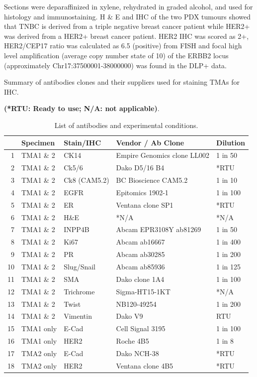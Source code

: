 Sections were deparaffinized in xylene, rehydrated in graded alcohol, and used for histology and immunostaining. 
H \& E and \ac{IHC}  of the two PDX tumours showed that TNBC is  derived from a triple negative breast cancer patient while HER2+ was derived from a HER2+ breast cancer patient. HER2 IHC was scored as 2+, HER2/CEP17 ratio was calculated as 6.5 (positive)\cite{ahn2020her2} from  \ac{FISH}  and focal high level amplification (average copy number state of 10) of the \ac{ERBB2} locus (approximately Chr17:37500001-38000000) was found in the DLP+ data.

\begin{table}
\centering
\caption{List of antibodies and experimental conditions.}
Summary of antibodies clones and their suppliers used for staining TMAs for IHC.

\small\textbf{(*RTU: Ready to use; N/A: not applicable)}.
\label{stab:antibodieslist}
\begin{tabular}{|rl|l|l|l|}
  \hline
 & Specimen & Stain/IHC & Vendor / Ab Clone & Dilution  \\ 
  \hline
1 & TMA1 \& 2 & CK14 & Empire Genomics clone LL002 & 1 in 50 \\ 
  2 & TMA1 \& 2 & Ck5/6 & Dako D5/16 B4 & *RTU  \\ 
  3 & TMA1 \& 2 & Ck8 (CAM5.2) & BC Bioscience CAM5.2 & 1 in 10  \\ 
  4 & TMA1 \& 2 & EGFR & Epitomics 1902-1 & 1 in 100  \\ 
  5 & TMA1 \& 2 & ER & Ventana  clone SP1 & *RTU\\ 
  6 & TMA1 \& 2 & H\&E & *N/A & *N/A \\ 
  7 & TMA1 \& 2 & INPP4B & Abcam EPR3108Y ab81269 & 1 in 50 \\ 
  8 & TMA1 \& 2 & Ki67 & Abcam ab16667  & 1 in 400  \\ 
  9 & TMA1 \& 2 & PR & Abcam ab30285 & 1 in 200  \\ 
  10 & TMA1 \& 2 & Slug/Snail & Abcam ab85936 & 1 in 125 \\ 
  11 & TMA1 \& 2 & SMA & Dako clone 1A4 & 1 in 100 \\ 
  12 & TMA1 \& 2 & Trichrome & Sigma-HT15-1KT & *N/A \\ 
  13 & TMA1 \& 2 & Twist & NB120-49254 & 1 in 200\\ 
  14 & TMA1 \& 2 & Vimentin & Dako V9 & RTU  \\ 
  15 & TMA1 only & E-Cad & Cell Signal 3195 & 1 in 100  \\ 
  16 & TMA1 only & HER2 & Roche 4B5 & 1 in 8  \\ 
  17 & TMA2 only & E-Cad & Dako NCH-38 & *RTU  \\ 
  18 & TMA2 only & HER2 & Ventana  clone 4B5 & *RTU \\ 
   \hline
\end{tabular}%
\end{table}

